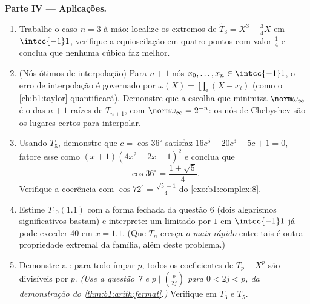 \begin{problem}
\medskip
\noindent\textbf{Parte IV --- Aplicações.}
\begin{enumerate}
  \item Trabalhe o caso $n = 3$ à mão: localize os extremos de
        $\widetilde T_3 = X^3 - \frac34X$ em $\intcc{-1}1$,
        verifique a equioscilação em quatro pontos com valor
        $\frac14$ e conclua que nenhuma cúbica  faz melhor.
  \item (Nós ótimos de interpolação) Para $n + 1$ nós $x_0,
        \dots, x_n \in \intcc{-1}1$, o erro de interpolação é
        governado por $\omega(X) = \prod_i (X - x_i)$ (como o
        \cref{ch:b1:taylor} quantificará). Demonstre que a escolha
        que minimiza $\norm\omega_\infty$ é o  das $n + 1$
        raízes de $T_{n+1}$, com $\norm\omega_\infty = 2^{-n}$:
        os nós de Chebyshev são os lugares certos para interpolar.
  \item Usando $T_5$, demonstre que $c = \cos 36^\circ$ satisfaz
        $16c^5 - 20c^3 + 5c + 1 = 0$, fatore esse  como
        $(x + 1)(4x^2 - 2x - 1)^2$ e conclua que
        \[
        \cos 36^\circ = \frac{1 + \sqrt5}4 .
        \]
        Verifique a coerência com $\cos 72^\circ =
        \frac{\sqrt5 - 1}4$ do \cref{exo:b1:complex:8}.
  \item Estime $T_{10}(1.1)$ com a forma fechada da questão 6
        (dois algarismos significativos bastam) e interprete: um
         limitado por $1$ em $\intcc{-1}1$ já pode
        exceder $40$ em $x = 1.1$. (Que $T_n$ cresça \emph{o mais
        rápido} entre tais  é outra propriedade
        extremal da família, além deste problema.)
  \item Demonstre a : para todo  ímpar $p$, todos os
        coeficientes de $T_p - X^p$ são divisíveis por $p$.
        \emph{(Use a questão 7 e $p \mid \binom p{2j}$ para $0 <
        2j < p$, da demonstração do
        \cref{thm:b1:arith:fermat}.)} Verifique em $T_3$ e $T_5$.
\end{enumerate}


\end{problem}
